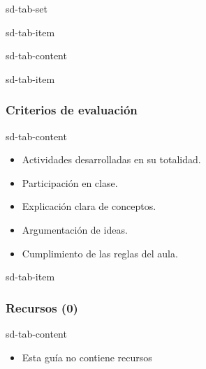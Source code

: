 \documentclass[letterpaper,10pt,spanish]{sphinxmanual}
\begin{document}
\begin{sphinxuseclass}{sd-tab-set}
\begin{sphinxuseclass}{sd-tab-item}
\begin{sphinxuseclass}{sd-tab-content}
\begin{itemize}
\end{itemize}

\end{sphinxuseclass}
\end{sphinxuseclass}
\begin{sphinxuseclass}{sd-tab-item}\subsubsection*{Criterios de evaluación}

\begin{sphinxuseclass}{sd-tab-content}\begin{itemize}
\item {} 
\sphinxAtStartPar
Actividades desarrolladas en su totalidad.

\item {} 
\sphinxAtStartPar
Participación en clase.

\item {} 
\sphinxAtStartPar
Explicación clara de conceptos.

\item {} 
\sphinxAtStartPar
Argumentación de ideas.

\item {} 
\sphinxAtStartPar
Cumplimiento de las reglas del aula.

\end{itemize}

\end{sphinxuseclass}
\end{sphinxuseclass}
\begin{sphinxuseclass}{sd-tab-item}\subsubsection*{Recursos (0)}

\begin{sphinxuseclass}{sd-tab-content}\begin{itemize}
\item {} 
\sphinxAtStartPar
Esta guía no contiene recursos

\end{itemize}

\end{sphinxuseclass}
\end{sphinxuseclass}
\end{sphinxuseclass}
\end{document}

